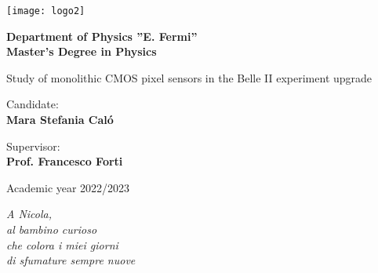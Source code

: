 \documentclass[10pt,a4paper]{report}
\begin{document}
\begin{titlepage}
    \begin{center}
        \texttt{[image: logo2]}
        \vspace*{1.2cm}

        \LARGE

        \textbf{ \large Department of Physics ''E. Fermi'' \\ Master's Degree in Physics}

        \vspace*{2.5cm}
        
        \huge
        Study of monolithic CMOS pixel sensors in the Belle II experiment upgrade

        \normalsize
        \vspace*{4cm}

        
        
        \begin{minipage}[t]{0.47\textwidth}
	       {Candidate:} \hspace{-0.9em} \vspace{0.3em} \\
              {\large \textbf{Mara Stefania Caló}} %
        \end{minipage}
        \hfill
        \begin{minipage}[t]{0.47\textwidth}\raggedleft
	       {Supervisor:} \vspace{0.3em} \\
              {\large \textbf{Prof. Francesco Forti}} \vspace{1em}  \\
        \end{minipage}

        \vfill
        Academic year 2022/2023
            
    \end{center}
\end{titlepage}


\clearpage
\null
\thispagestyle{empty}
\clearpage

\cleardoublepage
\thispagestyle{empty}
\begin{flushright}
\itshape A Nicola,\\
al bambino curioso \\
che colora i miei giorni \\
di sfumature sempre nuove
\end{flushright}
\cleardoublepage
\end{document}
